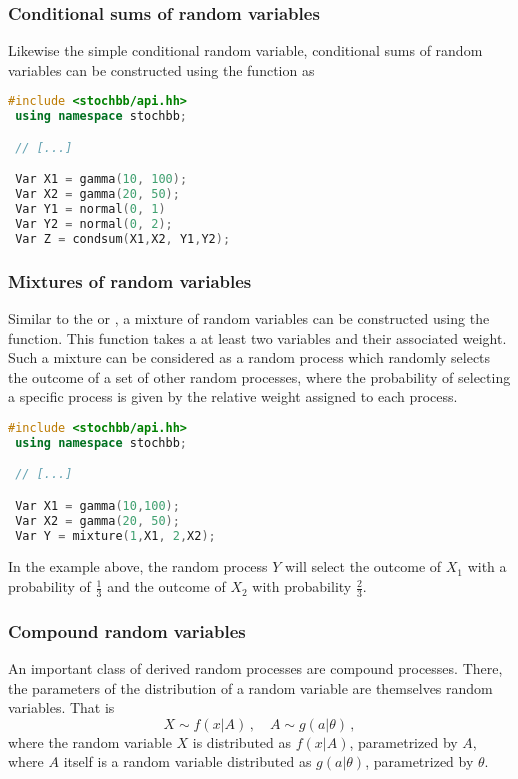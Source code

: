 \subsubsection{Conditional sums of random variables}
Likewise the simple conditional random variable, conditional sums of random variables can be constructed 
using the  function as 
\begin{lstlisting}[language=C++]
 #include <stochbb/api.hh>
 using namespace stochbb;

 // [...]

 Var X1 = gamma(10, 100);
 Var X2 = gamma(20, 50);
 Var Y1 = normal(0, 1)
 Var Y2 = normal(0, 2);
 Var Z = condsum(X1,X2, Y1,Y2);
\end{lstlisting}

\subsubsection{Mixtures of random variables}
Similar to the  or , a mixture of random variables can be
constructed using the  function. This function takes a at least 
two variables and their associated weight. Such a mixture can be considered as a random process which
randomly selects the outcome of a set of other random processes, where the probability of
selecting a specific process is given by the relative weight assigned to each process.
\begin{lstlisting}[language=C++]
 #include <stochbb/api.hh>
 using namespace stochbb;

 // [...]

 Var X1 = gamma(10,100);
 Var X2 = gamma(20, 50);
 Var Y = mixture(1,X1, 2,X2);
\end{lstlisting}

In the example above, the random process $Y$ will select the outcome of $X_1$ with
a probability of $\frac{1}{3}$ and the outcome of $X_2$ with probability
$\frac{2}{3}$.

\subsubsection{Compound random variables}
An important class of derived random processes are compound processes. There, the parameters of the
distribution of a random variable are themselves random variables. That is
\begin{equation}
 X \sim f(x|A)\,,\quad A \sim g(a|\theta)\,, \nonumber
\end{equation}
where the random variable $X$ is distributed as $f(x|A)$, parametrized by $A$,
where $A$ itself is a random variable distributed as $g(a|\theta)$, parametrized by
$\theta$. 

